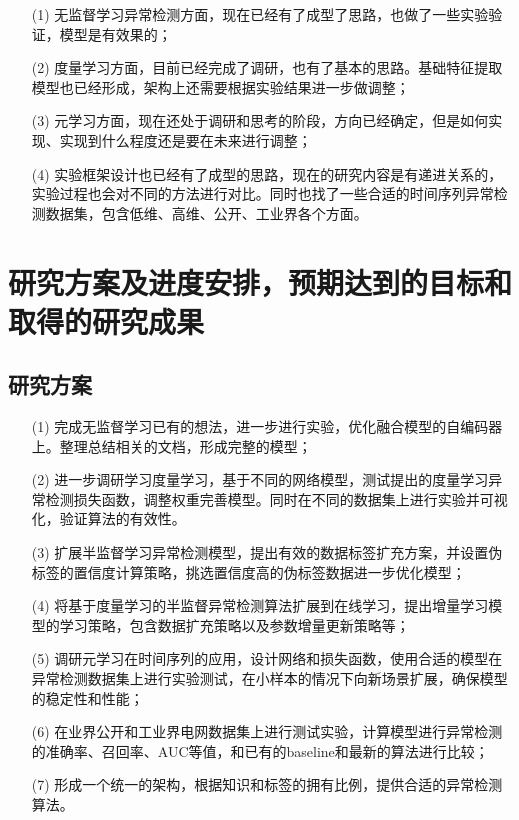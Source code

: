 \begin{itemize}
    \item[(1)] 无监督学习异常检测方面，现在已经有了成型了思路，也做了一些实验验证，模型是有效果的；
    \item[(2)] 度量学习方面，目前已经完成了调研，也有了基本的思路。基础特征提取模型也已经形成，架构上还需要根据实验结果进一步做调整；
    \item[(3)] 元学习方面，现在还处于调研和思考的阶段，方向已经确定，但是如何实现、实现到什么程度还是要在未来进行调整；
    \item[(4)] 实验框架设计也已经有了成型的思路，现在的研究内容是有递进关系的，实验过程也会对不同的方法进行对比。同时也找了一些合适的时间序列异常检测数据集，包含低维、高维、公开、工业界各个方面。
\end{itemize}

\section{研究方案及进度安排，预期达到的目标和取得的研究成果}

\subsection{研究方案}

\begin{itemize}
    \item[(1)] 完成无监督学习已有的想法，进一步进行实验，优化融合模型的自编码器上。整理总结相关的文档，形成完整的模型；
    \item[(2)] 进一步调研学习度量学习，基于不同的网络模型，测试提出的度量学习异常检测损失函数，调整权重完善模型。同时在不同的数据集上进行实验并可视化，验证算法的有效性。
    \item[(3)] 扩展半监督学习异常检测模型，提出有效的数据标签扩充方案，并设置伪标签的置信度计算策略，挑选置信度高的伪标签数据进一步优化模型；
    \item[(4)] 将基于度量学习的半监督异常检测算法扩展到在线学习，提出增量学习模型的学习策略，包含数据扩充策略以及参数增量更新策略等；
    \item[(5)] 调研元学习在时间序列的应用，设计网络和损失函数，使用合适的模型在异常检测数据集上进行实验测试，在小样本的情况下向新场景扩展，确保模型的稳定性和性能；
    \item[(6)] 在业界公开和工业界电网数据集上进行测试实验，计算模型进行异常检测的准确率、召回率、AUC等值，和已有的baseline和最新的算法进行比较； 
    \item[(7)] 形成一个统一的架构，根据知识和标签的拥有比例，提供合适的异常检测算法。
\end{itemize}

